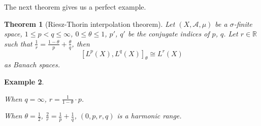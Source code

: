 \documentclass[reqno,UTF8]{amsart}
\numberwithin{equation}{section}
\theoremstyle{plain}
\newtheorem{theorem}{Theorem}[section]
\newtheorem{eg}[theorem]{Example}
\numberwithin{equation}{section}
\theoremstyle{remark}
\begin{document}
The next theorem gives us a perfect example.

\begin{theorem}[Riesz-Thorin interpolation theorem]\label{thm:interpolation_L_p}
Let $(X,\mathcal{A}, \mu)$ be a $\sigma$-finite space, $1 \le p < q \le \infty$, $0 \le \theta \le 1$, $p'$, $q'$ be the conjugate indices of $p$, $q$. Let $r \in \mathbb{R}$ such that $\frac{1}{r}= \frac{1-\theta}{p}+\frac{\theta}{q}$, then
$$\left[ L^p(X), L^q(X) \right]_{\theta}\cong L^r(X)$$
as Banach spaces.
\end{theorem}

\begin{eg}$\,$

When $q= \infty$, $r= \frac{1}{1-\theta} \cdot p$.

When $\theta=\frac{1}{2}$, $\frac{2}{r}=\frac{1}{p}+\frac{1}{q}$, $(0,p,r,q)$ is a harmonic range.
\end{eg}
\end{document}
